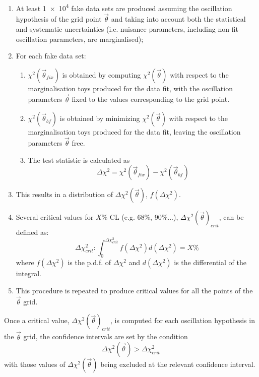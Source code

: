\begin{enumerate}
	\item At least \num{1e4} fake data sets are produced assuming the oscillation hypothesis of the grid point $\vec{\theta}$ and taking into account both the statistical and systematic uncertainties (i.e. nuisance parameters, including non-fit oscillation parameters, are marginalised); 
	\item For each fake data set:
	\begin{enumerate}
		\item $\chi^2(\vec{\theta}_{fix})$ is obtained by computing $\chi^2 (\vec{\theta})$ with respect to the marginalisation toys produced for the data fit, with the oscillation parameters $\vec{\theta}$ fixed to the values corresponding to the grid point.
		\item $\chi^2(\vec{\theta}_{bf})$ is obtained by minimizing $\chi^2 (\vec{\theta})$ with respect to the marginalisation toys produced for the data fit, leaving the oscillation parameters $\vec{\theta}$ free.
		\item The test statistic is calculated as
		\begin{equation}
		\Delta \chi^2 = \chi^2(\vec{\theta}_{fix}) - \chi^2 (\vec{\theta}_{bf})
		\end{equation} 
	\end{enumerate} 
	\item This results in a distribution of $\Delta \chi^2 (\vec{\theta})$, $f(\Delta \chi^2)$.
	\item Several critical values for $X\%$ CL (e.g. 68\%, 90\%...), $\Delta \chi^2 (\vec{\theta})_{crit}$, can be defined as:
	\begin{equation} \label{eq:def_crit_val}
	\Delta \chi^2_{crit}: \int_{0}^{\Delta \chi^2_{crit}} f(\Delta \chi^2) d( \Delta \chi^2) = X\%
	\end{equation}
	where $f(\Delta \chi^2)$ is the p.d.f. of $\Delta \chi^2$ and $d( \Delta \chi^2)$ is the differential of the integral.
	\item This procedure is repeated to produce critical values for all the points of the $\vec{\theta}$ grid.
\end{enumerate}

Once a critical value, $\Delta \chi^2 (\vec{\theta})_{crit}$, is computed for each oscillation hypothesis in the $\vec{\theta}$ grid, the confidence intervals are set by the condition
\begin{equation} \label{eq:condition_cl}
\Delta \chi^2(\vec{\theta}) > \Delta \chi^2_{crit}
\end{equation}
with those values of $\Delta \chi^2(\vec{\theta})$ being excluded at the relevant confidence interval.
\clearpage

